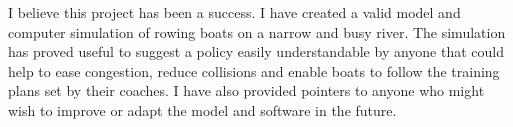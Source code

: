  I believe this project has been a success. I have created a valid model and computer simulation of rowing boats on a narrow and busy river. The simulation has proved useful to suggest a policy easily understandable by anyone that could help to ease congestion, reduce collisions and enable boats to follow the training plans set by their coaches. I have also provided pointers to anyone who might wish to improve or adapt the model and software in the future.

  